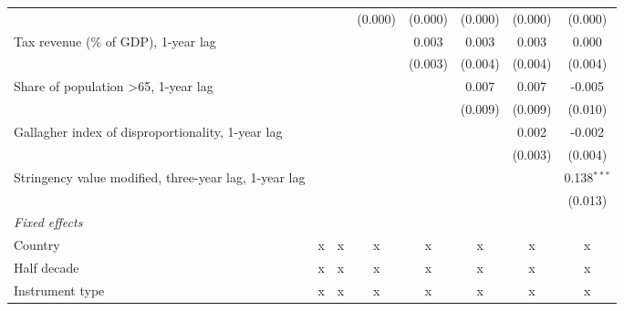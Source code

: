 \begin{tabular}{lccccccc}
                                                                           &              &              & (0.000)      & (0.000)      & (0.000)      & (0.000)      & (0.000)\\   
   Tax revenue (\% of GDP), 1-year lag                                     &              &              &              & 0.003        & 0.003        & 0.003        & 0.000\\   
                                                                           &              &              &              & (0.003)      & (0.004)      & (0.004)      & (0.004)\\   
   Share of population >65, 1-year lag                                     &              &              &              &              & 0.007        & 0.007        & -0.005\\   
                                                                           &              &              &              &              & (0.009)      & (0.009)      & (0.010)\\   
   Gallagher index of disproportionality, 1-year lag                       &              &              &              &              &              & 0.002        & -0.002\\   
                                                                           &              &              &              &              &              & (0.003)      & (0.004)\\   
   Stringency value modified, three-year lag, 1-year lag                   &              &              &              &              &              &              & 0.138$^{***}$\\   
                                                                           &              &              &              &              &              &              & (0.013)\\   
   \emph{Fixed effects}\\
   Country                                                                 & x            & x            & x            & x            & x            & x            & x\\  
   Half decade                                                             & x            & x            & x            & x            & x            & x            & x\\  
   Instrument type                                                         & x            & x            & x            & x            & x            & x            & x\\  

\end{tabular}
